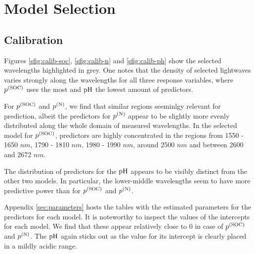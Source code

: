 \section{Model Selection}
\label{sec:model-selection}
	
	
	
	\subsection{Calibration}
	\label{ssec:calibration}
	
		Figures \ref{sfig:calib-soc}, \ref{sfig:calib-n} and \ref{sfig:calib-ph} show the selected wavelengths highlighted in grey.
		One notes that the density of selected lightwaves varies strongly along the wavelengths for all three response variables, where $p^{(\mathrm{SOC})}$ uses the most and $\mathrm{pH}$ the lowest amount of predictors.
		
		For $p^{(\mathrm{SOC})}$ and $p^{(\mathrm{N})}$, we find that similar regions seeminlgy relevant for prediction, albeit the predictors for $p^{(\mathrm{N})}$ appear to be slightly more evenly distributed along the whole domain of measured wavelengths. %
		In the selected model for $p^{(\mathrm{SOC})}$, predictors are highly concentrated in the regions from 1550 - 1650 $\unit{nm}$, 1790 - 1810 $\unit{nm}$, 1980 - 1990 $\unit{nm}$, around 2500 $\unit{nm}$ and between 2600 and 2672 $\unit{nm}$.
		
		The distribution of predictors for the $\mathrm{pH}$ appears to be visibly distinct from the other two models.
		In particular, the lower-middle wavelengths seem to have more predictive power than for $p^{(\mathrm{SOC})}$ and $p^{(\mathrm{N})}$.
		
		Appendix \ref{sec:parameters} hosts the tables with the estimated parameters for the predictors for each model.
		It is noteworthy to inspect the values of the intercepts for each model.
		We find that these appear relatively close to 0 in case of $p^{\mathrm{(SOC)}}$ and $p^{\mathrm{(N)}}$.
		The $\mathrm{pH}$ again sticks out as the value for its intercept is clearly placed in a mildly acidic range. %


